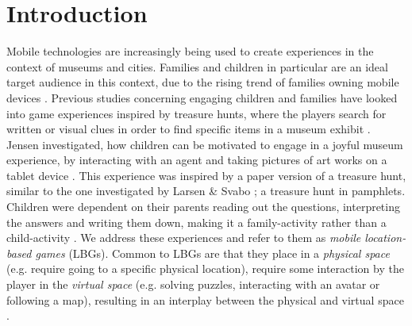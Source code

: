 \section{Introduction}
Mobile technologies are increasingly being used to create experiences in the context of museums and cities. Families and children in particular are an ideal target audience in this context, due to the rising trend of families owning mobile devices \cite{Statistik}. Previous studies concerning engaging children and families have looked into game experiences inspired by treasure hunts, where the players search for written or visual clues in order to find specific items in a museum exhibit \cite{Lynge}\cite{larsen2014tourist}. Jensen investigated, how children can be motivated to engage in a joyful museum experience, by interacting with an agent and taking pictures of art works on a tablet device \cite{Lynge}. This experience was inspired by a paper version of a treasure hunt, similar to the one investigated by Larsen \& Svabo \cite{larsen2014tourist}; a treasure hunt in pamphlets. Children were dependent on their parents reading out the questions, interpreting the answers and writing them down, making it a family-activity rather than a child-activity \cite{larsen2014tourist}. We address these experiences and refer to them as \textit{mobile location-based games} (LBGs). Common to LBGs are that they place in a \textit{physical space} (e.g. require going to a specific physical location), require some interaction by the player in the \textit{virtual space} (e.g. solving puzzles, interacting with an avatar or following a map), resulting in an interplay between the physical and virtual space \cite{LBG_Review}. 

